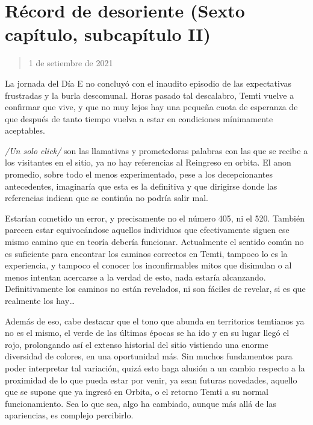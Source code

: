 \documentclass[
  spanish,
]{book}
\begin{document}
\hypertarget{ruxe9cord-de-desoriente-sexto-capuxedtulo-subcapuxedtulo-ii}{%
\section{Récord de desoriente (Sexto capítulo, subcapítulo II)}\label{ruxe9cord-de-desoriente-sexto-capuxedtulo-subcapuxedtulo-ii}}

\begin{quote}
1 de setiembre de 2021
\end{quote}

La jornada del Día E no concluyó con el inaudito episodio de las expectativas frustradas y la burla descomunal. Horas pasado tal descalabro, Temti vuelve a confirmar que vive, y que no muy lejos hay una pequeña cuota de esperanza de que después de tanto tiempo vuelva a estar en condiciones mínimamente aceptables.

\emph{/Un solo click/} son las llamativas y prometedoras palabras con las que se recibe a los visitantes en el sitio, ya no hay referencias al Reingreso en orbita. El anon promedio, sobre todo el menos experimentado, pese a los decepcionantes antecedentes, imaginaría que esta es la definitiva y que dirigirse donde las referencias indican que se continúa no podría salir mal.

Estarían cometido un error, y precisamente no el número 405, ni el 520. También parecen estar equivocándose aquellos individuos que efectivamente siguen ese mismo camino que en teoría debería funcionar. Actualmente el sentido común no es suficiente para encontrar los caminos correctos en Temti, tampoco lo es la experiencia, y tampoco el conocer los inconfirmables mitos que disimulan o al menos intentan acercarse a la verdad de esto, nada estaría alcanzando. Definitivamente los caminos no están revelados, ni son fáciles de revelar, si es que realmente los hay\ldots{}

Además de eso, cabe destacar que el tono que abunda en territorios temtianos ya no es el mismo, el verde de las últimas épocas se ha ido y en su lugar llegó el rojo, prolongando así el extenso historial del sitio vistiendo una enorme diversidad de colores, en una oportunidad más. Sin muchos fundamentos para poder interpretar tal variación, quizá esto haga alusión a un cambio respecto a la proximidad de lo que pueda estar por venir, ya sean futuras novedades, aquello que se supone que ya ingresó en Orbita, o el retorno Temti a su normal funcionamiento. Sea lo que sea, algo ha cambiado, aunque más allá de las apariencias, es complejo percibirlo.
\end{document}

